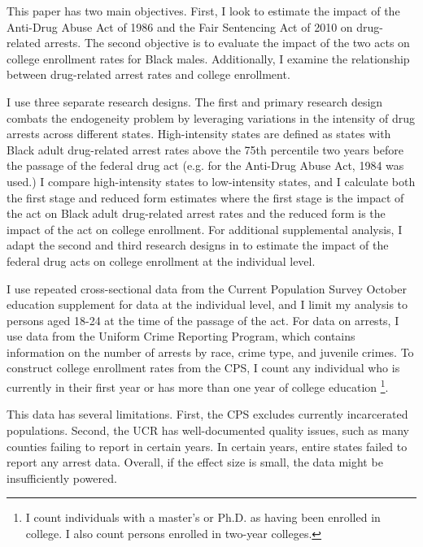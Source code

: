 \documentclass{article}
\begin{document}

This paper has two main objectives. First, I look to estimate the impact of the Anti-Drug Abuse Act of 1986 and the Fair Sentencing Act of 2010 on drug-related arrests. The second objective is to evaluate the impact of the two acts on college enrollment rates for Black males. Additionally, I examine the relationship between drug-related arrest rates and college enrollment. 


I use three separate research designs. The first and primary research design combats the endogeneity problem by leveraging variations in the intensity of drug arrests across different states. High-intensity states are defined as states with Black adult drug-related arrest rates above the 75th percentile two years before the passage of the federal drug act (e.g. for the Anti-Drug Abuse Act, 1984 was used.) I compare high-intensity states to low-intensity states, and I calculate both the first stage and reduced form estimates where the first stage is the impact of the act on Black adult drug-related arrest rates and the reduced form is the impact of the act on college enrollment. For additional supplemental analysis, I adapt the second and third research designs in \cite{britton2022} to estimate the impact of the federal drug acts on college enrollment at the individual level.


I use repeated cross-sectional data from the Current Population Survey October education supplement for data at the individual level, and I limit my analysis to persons aged 18-24 at the time of the passage of the act. For data on arrests, I use data from the Uniform Crime Reporting Program, which contains information on the number of arrests by race, crime type, and juvenile crimes. To construct college enrollment rates from the CPS, I count any individual who is currently in their first year or has more than one year of college education \footnote{I count individuals with a master's or Ph.D. as having been enrolled in college. I also count persons enrolled in two-year colleges.}.

This data has several limitations. First, the CPS excludes currently incarcerated populations. Second, the UCR has well-documented quality issues, such as many counties failing to report in certain years. In certain years, entire states failed to report any arrest data. Overall, if the effect size is small, the data might be insufficiently powered.
\end{document}
